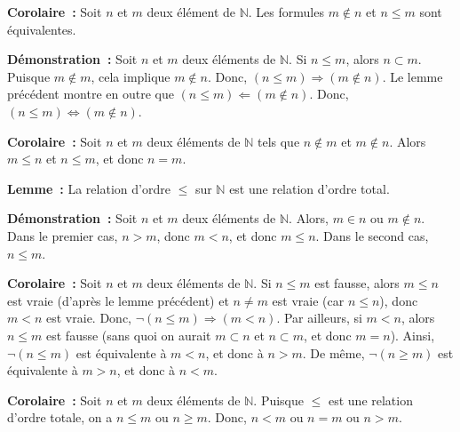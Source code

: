    \done 

\medskip

\noindent\textbf{Corolaire :} 
    Soit $n$ et $m$ deux élément de $\mathbb{N}$. 
    Les formules $m \notin n$ et $n \leq m$ sont équivalentes.

\medskip

\noindent\textbf{Démonstration :} 
    Soit $n$ et $m$ deux éléments de $\mathbb{N}$. 
    Si $n \leq m$, alors $n \subset m$. 
    Puisque $m \notin m$, cela implique $m \notin n$. 
    Donc, $(n \leq m) \Rightarrow (m \notin n)$.
    Le lemme précédent montre en outre que $(n \leq m) \Leftarrow (m \notin n)$.
    Donc, $(n \leq m) \Leftrightarrow (m \notin n)$.
    
   \done 

\medskip

\noindent\textbf{Corolaire :} Soit $n$ et $m$ deux éléments de $\mathbb{N}$ tels que $n \notin m$ et $m \notin n$. 
    Alors $m \leq n$ et $n \leq m$, et donc $n = m$.

\medskip

\noindent\textbf{Lemme :} La relation d'ordre $\leq$ sur $\mathbb{N}$ est une relation d'ordre total.

\medskip

\noindent\textbf{Démonstration :} 
    Soit $n$ et $m$ deux éléments de $\mathbb{N}$. 
    Alors, $m \in n$ ou $m \notin n$. 
    Dans le premier cas, $n > m$, donc $m < n$, et donc $m \leq n$.
    Dans le second cas, $n \leq m$.

   \done 

\medskip

\noindent\textbf{Corolaire :} Soit $n$ et $m$ deux éléments de $\mathbb{N}$. 
    Si $n \leq m$ est fausse, alors $m \leq n$ est vraie (d'après le lemme précédent) et $n \neq m$ est vraie (car $n \leq n$), donc $m < n$ est vraie. 
    Donc, $\neg (n \leq m) \Rightarrow (m < n)$. 
    Par ailleurs, si $m < n$, alors $n \leq m$ est fausse (sans quoi on aurait $m \subset n$ et $n \subset m$, et donc $m = n$).
    Ainsi, $\neg (n \leq m)$ est équivalente à $m < n$, et donc à $n > m$.
    De même, $\neg (n \geq m)$ est équivalente à $m > n$, et donc à $n < m$.

\medskip

\noindent\textbf{Corolaire :} Soit $n$ et $m$ deux éléments de $\mathbb{N}$. 
    Puisque $\leq$ est une relation d'ordre totale, on a $n \leq m$ ou $n \geq m$. 
    Donc, $n < m$ ou $n = m$ ou $n > m$. 

\medskip

